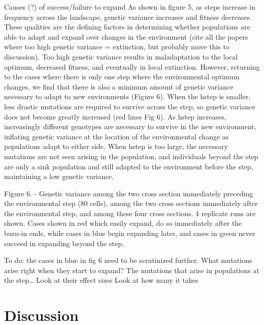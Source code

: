 Causes (?) of success/failure to expand
As shown in figure 5, as steps increase in frequency across the landscape, genetic variance 
increases and fitness decreases. These qualities are the defining factors in determining whether 
populations are able to adapt and expand over changes in the environment (cite all the papers 
where too high genetic variance = extinction, but probably move this to discussion). Too high 
genetic variance results in maladaptation to the local optimum, decreased fitness, and eventually 
in local extinction. However, returning to the cases where there is only one step where the 
environmental optimum changes, we find that there is also a minimum amount of genetic variance 
necessary to adapt to new environments (Figure 6). When the hstep is smaller, less drastic 
mutations are required to survive across the step, so genetic variance does not become greatly 
increased (red lines Fig 6). As hstep increases, increasingly different genotypes are necessary 
to survive in the new environment, inflating genetic variance at the location of the environmental 
change as populations adapt to either side. When hstep is too large, the necessary mutations are 
not seen arising in the population, and individuals beyond the step are only a sink population 
and still adapted to the environment before the step, maintaining a low genetic variance.

Figure 6. - Genetic variance among the two cross section immediately preceding the environmental 
step (80 cells), among the two cross sections immediately after the environmental step, and 
among these four cross sections. 4 replicate runs are shown. Cases shown in red which easily 
expand, do so immediately after the burn-in ends, while cases in blue begin expanding later, 
and cases in green never succeed in expanding beyond the step.

To do: the cases in blue in fig 6 need to be scrutinized further. What mutations arise 
right when they start to expand?
	The mutations that arise in populations at the step…
		Look at their effect sizes
		Look at how many it takes



\section{Discussion}

